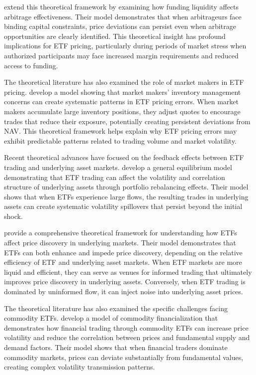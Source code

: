 \citet{gromb2010limits} extend this theoretical framework by examining how funding liquidity affects arbitrage effectiveness. Their model demonstrates that when arbitrageurs face binding capital constraints, price deviations can persist even when arbitrage opportunities are clearly identified. This theoretical insight has profound implications for ETF pricing, particularly during periods of market stress when authorized participants may face increased margin requirements and reduced access to funding.

The theoretical literature has also examined the role of market makers in ETF pricing. \citet{hendershott2013relationship} develop a model showing that market makers' inventory management concerns can create systematic patterns in ETF pricing errors. When market makers accumulate large inventory positions, they adjust quotes to encourage trades that reduce their exposure, potentially creating persistent deviations from NAV. This theoretical framework helps explain why ETF pricing errors may exhibit predictable patterns related to trading volume and market volatility.

Recent theoretical advances have focused on the feedback effects between ETF trading and underlying asset markets. \citet{malamud2016portfolio} develop a general equilibrium model demonstrating that ETF trading can affect the volatility and correlation structure of underlying assets through portfolio rebalancing effects. Their model shows that when ETFs experience large flows, the resulting trades in underlying assets can create systematic volatility spillovers that persist beyond the initial shock.

\citet{ben2017etfs} provide a comprehensive theoretical framework for understanding how ETFs affect price discovery in underlying markets. Their model demonstrates that ETFs can both enhance and impede price discovery, depending on the relative efficiency of ETF and underlying asset markets. When ETF markets are more liquid and efficient, they can serve as venues for informed trading that ultimately improves price discovery in underlying assets. Conversely, when ETF trading is dominated by uninformed flow, it can inject noise into underlying asset prices.

The theoretical literature has also examined the specific challenges facing commodity ETFs. \citet{basak2016model} develop a model of commodity financialization that demonstrates how financial trading through commodity ETFs can increase price volatility and reduce the correlation between prices and fundamental supply and demand factors. Their model shows that when financial traders dominate commodity markets, prices can deviate substantially from fundamental values, creating complex volatility transmission patterns.

